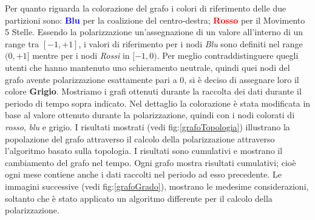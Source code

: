 Per quanto riguarda la colorazione del grafo i colori di riferimento delle due partizioni sono: \textcolor{blue}{\textbf{Blu}} per la coalizione del centro-destra; \textcolor{red}{\textbf{Rosso}} per il Movimento 5 Stelle.
Essendo la polarizzazione un'assegnazione di un valore all'interno di un range tra $[-1,+1]$, i valori di riferimento per i nodi \textit{Blu} sono definiti nel range $(0,+1]$ mentre per i nodi \textit{Rossi} in $[-1,0)$.
Per meglio contraddistinguere quegli utenti che hanno mantenuto uno schieramento neutrale, quindi quei nodi del grafo avente polarizzazione esattamente pari a 0, si è deciso di assegnare loro il colore \textbf{Grigio}.
Mostriamo i grafi ottenuti durante la raccolta dei dati durante il periodo di tempo sopra indicato. Nel dettaglio la colorazione è stata modificata in base al valore ottenuto durante la polarizzazione, quindi con i nodi colorati di \textit{rosso}, \textit{blu} e grigio.
I risultati mostrati (vedi fig:\ref{grafoTopologia}) illustrano la popolazione del grafo attraverso il calcolo della polarizzazione attraverso l'algoritmo basato sulla topologia. I risultati sono cumulativi e mostrano il cambiamento del grafo nel tempo. Ogni grafo mostra risultati cumulativi; cioè ogni mese contiene anche i dati  raccolti nel periodo ad esso precedente. Le immagini successive (vedi fig:\ref{grafoGrado}), mostrano le medesime considerazioni, soltanto che è stato applicato un algoritmo differente per il calcolo della polarizzazione.

